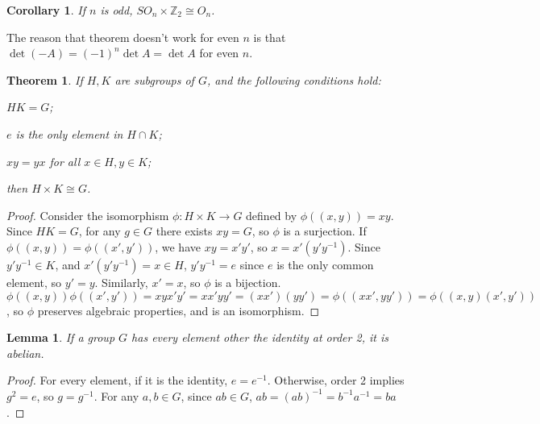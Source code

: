 \documentclass{article}
\newtheorem{theorem}{Theorem}[section]
\newtheorem{corollary}{Corollary}[theorem]
\newtheorem{lemma}{Lemma}[section]
\begin{document}
\begin{corollary}
    If $n$ is odd, $SO_n \times \mathbb{Z}_2 \cong O_n$.
\end{corollary}

The reason that theorem doesn't work for even $n$ is that $\det(-A) = (-1)^{n}\det A = \det A$ for even $n$.

\begin{theorem}
    \label{thm:isomorphic_product_of_subgroups}
    If $H,K$ are subgroups of $G$, and the following conditions hold:
    \begin{compactitem}
    \item $HK = G$;
    \item $e$ is the only element in $H \cap K$;
    \item $xy = yx$ for all $x \in H, y \in K$;
    \end{compactitem}
    then $H \times K \cong G$.
\end{theorem}
\begin{proof}
    Consider the isomorphism $\phi : H \times K \to G$ defined by $\phi((x,y)) = xy$.
    Since $HK = G$, for any $g \in G$ there exists $xy = G$, so $\phi$ is a surjection.
    If $\phi((x,y))=\phi((x',y'))$, we have $xy = x'y'$, so $x = x'(y'y^{-1})$.
    Since $y'y^{-1} \in K$, and $x'(y'y^{-1}) = x \in H$, 
    $y'y^{-1} = e$ since $e$ is the only common element, so $y' = y$.
    Similarly, $x' = x$, so $\phi$ is a bijection.
    $\phi((x,y))\phi((x',y')) = xyx'y' = xx'yy' = (xx')(yy') = \phi((xx',yy')) = \phi((x,y)(x',y'))$,
    so $\phi$ preserves algebraic properties, and is an isomorphism.
\end{proof}

\begin{lemma}
    If a group $G$ has every element other the identity at order 2,
    it is abelian.
\end{lemma}
\begin{proof}
    For every element, if it is the identity, $e = e^{-1}$. 
    Otherwise, order 2 implies $g^{2} = e$, so $g = g^{-1}$.
    For any $a,b \in G$, since $ab \in G$, $ab = (ab)^{-1} = b^{-1}a^{-1} = ba$.
\end{proof}
\end{document}
